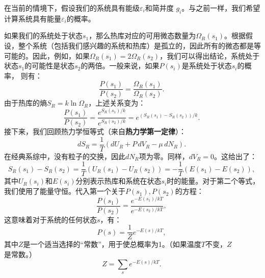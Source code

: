在当前的情境下，假设我们的系统具有能级\( \varepsilon_i \)和简并度 \( g_i \)。与之前一样，我们希望计算系统具有能量\( \varepsilon_i \)的概率。

如果我们的系统处于状态\(s_1\)，那么热库对应的可用微态数量为\(\Omega_R(s_1)\)。根据假设，整个系统（包括我们感兴趣的系统和热库）是孤立的，因此所有的微态都是等可能的。因此，例如，如果\(\Omega_R(s_1) = 2 \Omega_R(s_2)\)，我们可以得出结论，系统处于状态\(s_1 \)的可能性是状态\(s_2\)的两倍。一般来说，如果\(P(s_i)\)是系统处于状态\(s_i\)的概率， 则有：
\[
\frac{P(s_1)}{P(s_2)} = \frac{\Omega_R(s_1)}{\Omega_R(s_2)}.~
\]
由于热库的熵\( S_R = k \ln \Omega_R \)，上述关系变为：
\[
\frac{P(s_1)}{P(s_2)} = \frac{e^{S_R(s_1)/k}}{e^{S_R(s_2)/k}} = e^{(S_R(s_1) - S_R(s_2))/k}.~
\]
接下来，我们回顾热力学恒等式（来自\textbf{热力学第一定律}）：
\[
dS_R = \frac{1}{T}(dU_R + P\,dV_R - \mu\,dN_R).~
\]
在经典系综中，没有粒子的交换，因此\( dN_R \)项为零。同样，\( dV_R = 0 \)。这给出了：
\[
S_R(s_1) - S_R(s_2) = \frac{1}{T} \left( U_R(s_1) - U_R(s_2) \right) = - \frac{1}{T} \left( E(s_1) - E(s_2) \right),~
\]
其中\( U_R(s_i) \)和\( E(s_i) \)分别表示热库和系统在状态\( s_i \)时的能量。对于第二个等式，我们使用了能量守恒。代入第一个关于\( P(s_1), P(s_2) \)的方程：
\[
\frac{P(s_1)}{P(s_2)} = \frac{e^{-E(s_1)/kT}}{e^{-E(s_2)/kT}},~
\]
这意味着对于系统的任何状态\( s \)，有：
\[
P(s) = \frac{1}{Z} e^{-E(s)/kT},~
\]
其中\( Z \)是一个适当选择的“常数”，用于使总概率为1。（如果温度\( T \)不变，\( Z \)是常数。）
\[
Z = \sum_s e^{-E(s)/kT}.~
\]
